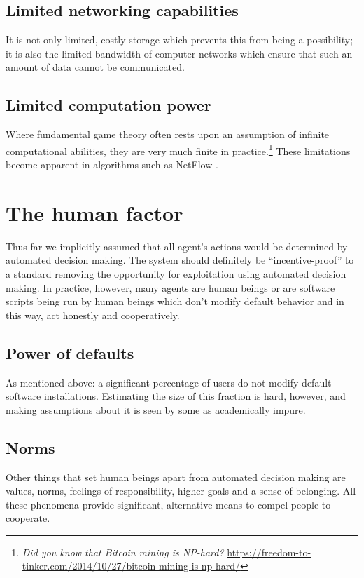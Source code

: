 \subsection{Limited networking capabilities}
It is not only limited, costly storage which prevents this from being a possibility; it is also the limited bandwidth of computer networks which ensure that such an amount of data cannot be communicated.

\subsection{Limited computation power}
Where fundamental game theory often rests upon an assumption of infinite computational abilities, they are very much finite in practice.\footnote{\emph{Did you know that Bitcoin mining is NP-hard?} \url{https://freedom-to-tinker.com/2014/10/27/bitcoin-mining-is-np-hard/}} These limitations become apparent in algorithms such as NetFlow \cite{otte2016sybil}.

\section{The human factor}
Thus far we implicitly assumed that all agent's actions would be determined by automated decision making. The system should definitely be ``incentive-proof'' to a standard removing the opportunity for exploitation using automated decision making. In practice, however, many agents are human beings or are software scripts being run by human beings which don't modify default behavior and in this way, act honestly and cooperatively.

\subsection{Power of defaults}
As mentioned above: a significant percentage of users do not modify default software installations. Estimating the size of this fraction is hard, however, and making assumptions about it is seen by some as academically impure.

\subsection{Norms}
Other things that set human beings apart from automated decision making are values, norms, feelings of responsibility, higher goals and a sense of belonging. All these phenomena provide significant, alternative means to compel people to cooperate.

